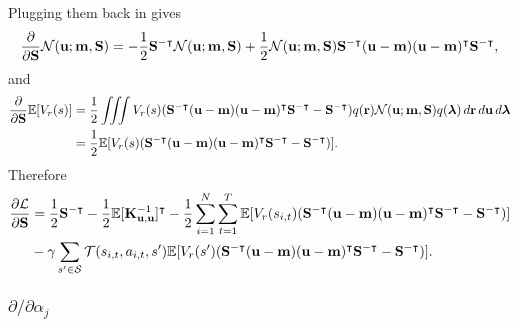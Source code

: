 \documentclass{mprop}
\theoremstyle{definition}
\begin{document}
Plugging them back in gives
\[ \frac{\partial}{\partial\mathbf{S}}\mathcal{N}(\mathbf{u}; \mathbf{m}, \mathbf{S}) =
  -\frac{1}{2}\mathbf{S}^{-\intercal}\mathcal{N}(\mathbf{u};
  \mathbf{m}, \mathbf{S}) + \frac{1}{2}\mathcal{N}(\mathbf{u}; \mathbf{m},
  \mathbf{S})\mathbf{S}^{-\intercal}(\mathbf{u} - \mathbf{m})(\mathbf{u} -
  \mathbf{m})^\intercal\mathbf{S}^{-\intercal}, \]
and
\[
  \begin{split}
    \frac{\partial}{\partial\mathbf{S}}\mathbb{E}[V_r(s)] &= \frac{1}{2}\iiint V_r(s)
    (\mathbf{S}^{-\intercal}(\mathbf{u} - \mathbf{m})(\mathbf{u} -
    \mathbf{m})^\intercal\mathbf{S}^{-\intercal} - \mathbf{S}^{-\intercal})
    q(\mathbf{r}) \mathcal{N}(\mathbf{u};
    \mathbf{m}, \mathbf{S}) q(\bm\lambda)\,d\mathbf{r}\,d\mathbf{u}\,d\bm\lambda
    \\
    &= \frac{1}{2}\mathbb{E}[V_r(s)(\mathbf{S}^{-\intercal}(\mathbf{u} -
    \mathbf{m})(\mathbf{u} - \mathbf{m})^\intercal\mathbf{S}^{-\intercal} -
    \mathbf{S}^{-\intercal})].
  \end{split}
\]
Therefore
\[
  \begin{split}
    \frac{\partial\mathcal{L}}{\partial\mathbf{S}} &=
    \frac{1}{2}\mathbf{S}^{-\intercal} -
    \frac{1}{2}\mathbb{E}[\mathbf{K}_{\mathbf{u},\mathbf{u}}^{-1}]^\intercal - \frac{1}{2}
    \sum_{i=1}^N\sum_{t=1}^T
    \mathbb{E}[V_r(s_{i,t})(\mathbf{S}^{-\intercal}(\mathbf{u} -
    \mathbf{m})(\mathbf{u} - \mathbf{m})^\intercal\mathbf{S}^{-\intercal} -
    \mathbf{S}^{-\intercal})] \\
    &- \gamma\sum_{s' \in \mathcal{S}}\mathcal{T}(s_{i,t}, a_{i,t}, s')
    \mathbb{E}[V_r(s')(\mathbf{S}^{-\intercal}(\mathbf{u} -
    \mathbf{m})(\mathbf{u} - \mathbf{m})^\intercal\mathbf{S}^{-\intercal} -
    \mathbf{S}^{-\intercal})].
  \end{split}
\]

\subsubsection{$\partial/\partial\alpha_j$}
\end{document}
